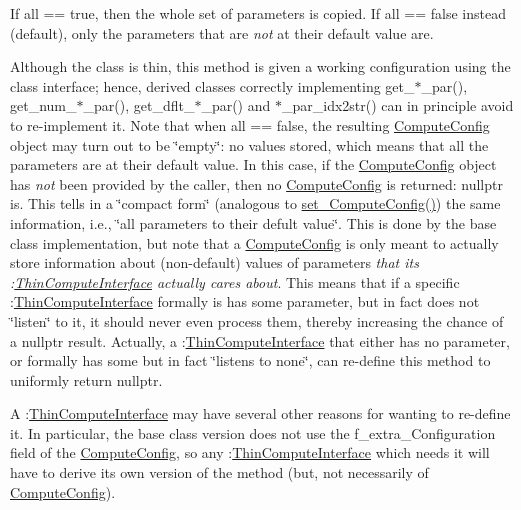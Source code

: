 If all == true, then the whole set of parameters is copied. If all == false instead (default), only the parameters that are {\itshape not} at their default value are.

Although the class is thin, this method is given a working configuration using the class interface; hence, derived classes correctly implementing get\+\_\+$\ast$\+\_\+par(), get\+\_\+num\+\_\+$\ast$\+\_\+par(), get\+\_\+dflt\+\_\+$\ast$\+\_\+par() and $\ast$\+\_\+par\+\_\+idx2str() can in principle avoid to re-\/implement it. Note that when all == false, the resulting \mbox{\hyperlink{class_s_m_spp__di__unipi__it_1_1_compute_config}{Compute\+Config}} object may turn out to be \char`\"{}empty\char`\"{}\+: no values stored, which means that all the parameters are at their default value. In this case, if the \mbox{\hyperlink{class_s_m_spp__di__unipi__it_1_1_compute_config}{Compute\+Config}} object has {\itshape not} been provided by the caller, then no \mbox{\hyperlink{class_s_m_spp__di__unipi__it_1_1_compute_config}{Compute\+Config}} is returned\+: nullptr is. This tells in a \char`\"{}compact form\char`\"{} (analogous to \mbox{\hyperlink{class_s_m_spp__di__unipi__it_1_1_thin_compute_interface_a8f4741c9baa5d7de2bd6129f3d08bf16}{set\+\_\+\+Compute\+Config()}}) the same information, i.\+e., \char`\"{}all parameters to their defult value\char`\"{}. This is done by the base class implementation, but note that a \mbox{\hyperlink{class_s_m_spp__di__unipi__it_1_1_compute_config}{Compute\+Config}} is only meant to actually store information about (non-\/default) values of parameters {\itshape that its \+:\mbox{\hyperlink{class_s_m_spp__di__unipi__it_1_1_thin_compute_interface}{Thin\+Compute\+Interface}} actually cares about}. This means that if a specific \+:\mbox{\hyperlink{class_s_m_spp__di__unipi__it_1_1_thin_compute_interface}{Thin\+Compute\+Interface}} formally is has some parameter, but in fact does not \char`\"{}listen\char`\"{} to it, it should never even process them, thereby increasing the chance of a nullptr result. Actually, a \+:\mbox{\hyperlink{class_s_m_spp__di__unipi__it_1_1_thin_compute_interface}{Thin\+Compute\+Interface}} that either has no parameter, or formally has some but in fact \char`\"{}listens to none\char`\"{}, can re-\/define this method to uniformly return nullptr.

A \+:\mbox{\hyperlink{class_s_m_spp__di__unipi__it_1_1_thin_compute_interface}{Thin\+Compute\+Interface}} may have several other reasons for wanting to re-\/define it. In particular, the base class version does not use the f\+\_\+extra\+\_\+\+Configuration field of the \mbox{\hyperlink{class_s_m_spp__di__unipi__it_1_1_compute_config}{Compute\+Config}}, so any \+:\mbox{\hyperlink{class_s_m_spp__di__unipi__it_1_1_thin_compute_interface}{Thin\+Compute\+Interface}} which needs it will have to derive its own version of the method (but, not necessarily of \mbox{\hyperlink{class_s_m_spp__di__unipi__it_1_1_compute_config}{Compute\+Config}}). 

